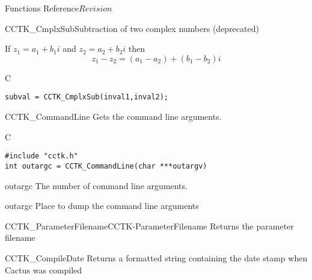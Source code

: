 \begin{cactuspart}{ Functions Reference}{}{$Revision$}
\begin{FunctionDescription}{CCTK\_CmplxSub}{Subtraction of two complex numbers (deprecated)}
\begin{Discussion}
If $z_1=a_1 + b_1 i$ and $z_2 = a_2+ b_2 i$ then
$$
z_1-z_2 = (a_1-a_2)+ (b_1 - b_2)i
$$
\end{Discussion}
\begin{ExampleSection}
\begin{Example}{C}
\begin{verbatim}
subval = CCTK_CmplxSub(inval1,inval2);
\end{verbatim}
\end{Example}
\end{ExampleSection}
\end{FunctionDescription}


\begin{FunctionDescription}{CCTK\_CommandLine}
\label{CCTK-CommandLine}
Gets the command line arguments.

\begin{SynopsisSection}
\begin{Synopsis}{C}
\begin{verbatim}
#include "cctk.h"
int outargc = CCTK_CommandLine(char ***outargv)
\end{verbatim}
\end{Synopsis}
\end{SynopsisSection}

\begin{ResultSection}
\begin{Result}{outargc}
  The number of command line arguments.
\end{Result}
\end{ResultSection}

\begin{ParameterSection}
\begin{Parameter}{outargc}
   Place to dump the command line arguments
\end{Parameter}
\end{ParameterSection}

\begin{SeeAlsoSection}
\begin{SeeAlso2}{CCTK\_ParameterFilename}{CCTK-ParameterFilename}
   Returns the parameter filename
\end{SeeAlso2}
\end{SeeAlsoSection}
\end{FunctionDescription}


\begin{FunctionDescription}{CCTK\_CompileDate}
\label{CCTK-CompileDate}
Returns a formatted string containing the date stamp when Cactus was compiled


\end{FunctionDescription}
\end{cactuspart}
